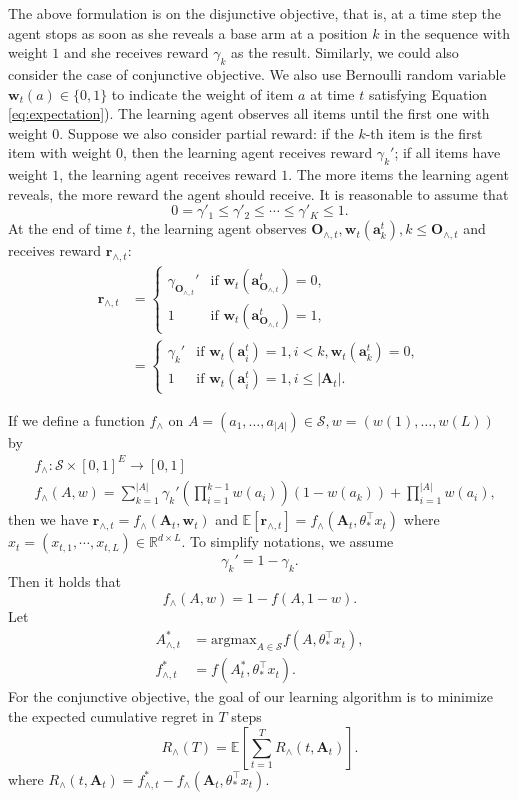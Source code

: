 \documentclass{article}
\newcommand{\EE}{\mathbb{E}}
\newcommand{\RR}{\mathbb{R}}
\newcommand{\bA}{\mathbf{A}}
\newcommand{\ba}{\mathbf{a}}
\newcommand{\bO}{\mathbf{O}}
\newcommand{\br}{\mathbf{r}}
\newcommand{\bw}{\mathbf{w}}
\newcommand{\cS}{\mathcal{S}}
\newcommand{\argmax}{\mathrm{argmax}}
\newcommand{\abs}[1]{\left| #1 \right|}
\begin{document}
The above formulation is on the disjunctive objective, that is, at a time step the agent stops as soon as she reveals a base arm at a position $k$ in the sequence with weight $1$ and she receives reward $\gamma_k$ as the result. Similarly, we could also consider the case of conjunctive objective. We also use Bernoulli random variable $\bw_{t}(a) \in \{0,1\}$ to indicate the weight of item $a$ at time $t$ satisfying Equation \eqref{eq:expectation}). The learning agent observes all items until the first one with weight $0$. Suppose we also consider partial reward: if the $k$-th item is the first item with weight $0$, then the learning agent receives reward $\gamma_k'$; if all items have weight $1$, the learning agent receives reward $1$. The more items the learning agent reveals, the more reward the agent should receive. It is reasonable to assume that
$$
0 = \gamma'_1 \leq \gamma'_2 \leq \cdots \leq \gamma'_K \leq 1.
$$
At the end of time $t$, the learning agent observes $\bO_{\wedge, t}, \bw_t(\ba_k^t), k \leq \bO_{\wedge, t}$ and receives reward
	$\br_{\wedge, t}$:
\begin{align*}
\br_{\wedge, t} &= \begin{cases}
\gamma_{\bO_{\wedge, t}}'  &\text{if } \bw_t(\ba_{\bO_{\wedge, t}}^t) = 0,\\
1 &\text{if } \bw_t(\ba_{\bO_{\wedge, t}}^t) = 1,
\end{cases}\\
&=\begin{cases}
\gamma_{k}'  &\text{if } \bw_t(\ba_{i}^t) = 1, i < k, \bw_t(\ba_{k}^t) = 0,\\
1 &\text{if } \bw_t(\ba_{i}^t) = 1, i\leq \abs{\bA_t}.
\end{cases}
\end{align*}

If we define a function $f_{\wedge}$ on $A = (a_1, \ldots, a_{\abs{A}}) \in \cS, w = (w(1), \ldots, w(L))$ by
\begin{align*}
&f_{\wedge} : \cS \times [0,1]^E \to [0,1]\\
&f_{\wedge}(A,w) = \sum_{k = 1}^{\abs{A}} \gamma_k' (\prod_{i = 1}^{k - 1} w(a_i))(1 - w(a_k)) + \prod_{i=1}^{\abs{A}}w(a_i),
\end{align*}
then we have $\br_{\wedge, t} = f_{\wedge}(\bA_t, \bw_t)$ and $\EE[\br_{\wedge, t}] = f_{\wedge}(\bA_t, \theta_{\ast}^{\top}x_t)$ where $x_t = (x_{t,1}, \cdots, x_{t,L}) \in \RR^{d \times L}$. To simplify notations, we assume 
$$
\gamma_k' = 1 - \gamma_k.
$$
Then it holds that
\begin{equation}
\label{eq:ConDisRelation}
f_{\wedge}(A, w) = 1 - f(A, 1 - w).
\end{equation}
Let 
\begin{align*}
A_{\wedge, t}^{\ast} &= \argmax_{A\in \cS} f(A,\theta_{\ast}^{\top}x_t),\\
f_{\wedge, t}^{\ast} &= f(A_t^{\ast}, \theta_{\ast}^{\top}x_t).
\end{align*}
For the conjunctive objective, the goal of our learning algorithm is to minimize the expected cumulative regret in $T$ steps
$$
R_{\wedge}(T) = \EE[\sum_{t=1}^T R_{\wedge}(t, \bA_t)].
$$
where $R_{\wedge}(t, \bA_t) = f_{\wedge, t}^{\ast} - f_{\wedge}(\bA_t, \theta_{\ast}^{\top}x_t)$.
\end{document}
